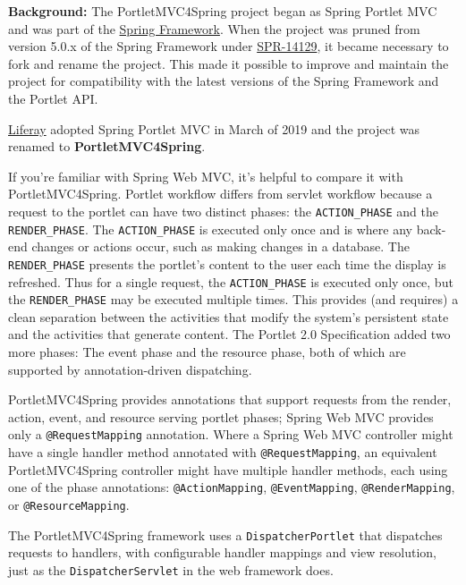 \noindent\hrulefill

\textbf{Background:} The PortletMVC4Spring project began as Spring
Portlet MVC and was part of the
\href{https://spring.io/projects/spring-framework}{Spring Framework}.
When the project was pruned from version 5.0.x of the Spring Framework
under
\href{https://github.com/spring-projects/spring-framework/issues/18701}{SPR-14129},
it became necessary to fork and rename the project. This made it
possible to improve and maintain the project for compatibility with the
latest versions of the Spring Framework and the Portlet API.

\href{http://www.liferay.com}{Liferay} adopted Spring Portlet MVC in
March of 2019 and the project was renamed to \textbf{PortletMVC4Spring}.

\noindent\hrulefill

If you're familiar with Spring Web MVC, it's helpful to compare it with
PortletMVC4Spring. Portlet workflow differs from servlet workflow
because a request to the portlet can have two distinct phases: the
\texttt{ACTION\_PHASE} and the \texttt{RENDER\_PHASE}. The
\texttt{ACTION\_PHASE} is executed only once and is where any back-end
changes or actions occur, such as making changes in a database. The
\texttt{RENDER\_PHASE} presents the portlet's content to the user each
time the display is refreshed. Thus for a single request, the
\texttt{ACTION\_PHASE} is executed only once, but the
\texttt{RENDER\_PHASE} may be executed multiple times. This provides
(and requires) a clean separation between the activities that modify the
system's persistent state and the activities that generate content. The
Portlet 2.0 Specification added two more phases: The event phase and the
resource phase, both of which are supported by annotation-driven
dispatching.

PortletMVC4Spring provides annotations that support requests from the
render, action, event, and resource serving portlet phases; Spring Web
MVC provides only a \texttt{@RequestMapping} annotation. Where a Spring
Web MVC controller might have a single handler method annotated with
\texttt{@RequestMapping}, an equivalent PortletMVC4Spring controller
might have multiple handler methods, each using one of the phase
annotations: \texttt{@ActionMapping}, \texttt{@EventMapping},
\texttt{@RenderMapping}, or \texttt{@ResourceMapping}.

The PortletMVC4Spring framework uses a \texttt{DispatcherPortlet} that
dispatches requests to handlers, with configurable handler mappings and
view resolution, just as the \texttt{DispatcherServlet} in the web
framework does.

